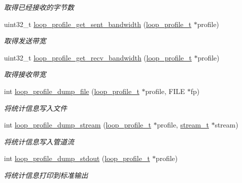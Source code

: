 \begin{DoxyCompactItemize}
\begin{DoxyCompactList}\small\item\em 取得已经接收的字节数 \end{DoxyCompactList}\item 
uint32\+\_\+t \hyperlink{a00078_a05b508d71cdd8841e352657afa86b919_a05b508d71cdd8841e352657afa86b919}{loop\+\_\+profile\+\_\+get\+\_\+sent\+\_\+bandwidth} (\hyperlink{a00051_ad060e1396346d2f5db1ec0597376a107_ad060e1396346d2f5db1ec0597376a107}{loop\+\_\+profile\+\_\+t} $\ast$profile)
\begin{DoxyCompactList}\small\item\em 取得发送带宽 \end{DoxyCompactList}\item 
uint32\+\_\+t \hyperlink{a00078_aa14aa9382129b3c7facf5160ab7b1f7c_aa14aa9382129b3c7facf5160ab7b1f7c}{loop\+\_\+profile\+\_\+get\+\_\+recv\+\_\+bandwidth} (\hyperlink{a00051_ad060e1396346d2f5db1ec0597376a107_ad060e1396346d2f5db1ec0597376a107}{loop\+\_\+profile\+\_\+t} $\ast$profile)
\begin{DoxyCompactList}\small\item\em 取得接收带宽 \end{DoxyCompactList}\item 
int \hyperlink{a00078_ab1f417c556537e763c3b06e9129740a6_ab1f417c556537e763c3b06e9129740a6}{loop\+\_\+profile\+\_\+dump\+\_\+file} (\hyperlink{a00051_ad060e1396346d2f5db1ec0597376a107_ad060e1396346d2f5db1ec0597376a107}{loop\+\_\+profile\+\_\+t} $\ast$profile, F\+I\+L\+E $\ast$fp)
\begin{DoxyCompactList}\small\item\em 将统计信息写入文件 \end{DoxyCompactList}\item 
int \hyperlink{a00078_a8fdc6b3f9949a392d5158ca4b6120bc1_a8fdc6b3f9949a392d5158ca4b6120bc1}{loop\+\_\+profile\+\_\+dump\+\_\+stream} (\hyperlink{a00051_ad060e1396346d2f5db1ec0597376a107_ad060e1396346d2f5db1ec0597376a107}{loop\+\_\+profile\+\_\+t} $\ast$profile, \hyperlink{a00051_a261dba04f46f5c59a68a05f69f5a65a8_a261dba04f46f5c59a68a05f69f5a65a8}{stream\+\_\+t} $\ast$stream)
\begin{DoxyCompactList}\small\item\em 将统计信息写入管道流 \end{DoxyCompactList}\item 
int \hyperlink{a00078_a8053f8ce58d9a9ecb90db0696a427851_a8053f8ce58d9a9ecb90db0696a427851}{loop\+\_\+profile\+\_\+dump\+\_\+stdout} (\hyperlink{a00051_ad060e1396346d2f5db1ec0597376a107_ad060e1396346d2f5db1ec0597376a107}{loop\+\_\+profile\+\_\+t} $\ast$profile)
\begin{DoxyCompactList}\small\item\em 将统计信息打印到标准输出 \end{DoxyCompactList}\end{DoxyCompactItemize}


